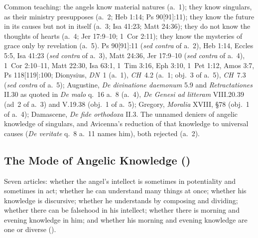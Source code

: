  {Common teaching: the angels know material natures (a.~1); they know
 singulars, as their ministry presupposes (a.~2; Heb 1:14; Ps
 90[91]:11); they know the future in its causes but not in itself (a.~3;
 Isa 41:23; Matt 24:36); they do not know the thoughts of hearts (a.~4;
 Jer 17:9--10; 1~Cor 2:11); they know the mysteries of grace only by
 revelation (a.~5).}
 {Ps 90[91]:11 (\emph{sed contra} of a.~2), Heb 1:14, Eccles 5:5, Isa
 41:23 (\emph{sed contra} of a.~3), Matt 24:36, Jer 17:9--10 (\emph{sed
 contra} of a.~4), 1~Cor 2:10--11, Matt 22:30, Isa 63:1, 1~Tim 3:16, Eph
 3:10, 1~Pet 1:12, Amos 3:7, Ps 118[119]:100; Dionysius, \emph{DN}~1
 (a.~1), \emph{CH}~4.2 (a.~1; obj.~3 of a.~5), \emph{CH}~7.3 (\emph{sed
 contra} of a.~5); Augustine, \emph{De divinatione daemonum} 5.9 and
 \emph{Retractationes} II.30 as quoted in \emph{De malo} q.~16 a.~8
 (a.~4), \emph{De Genesi ad litteram} VIII.20.39 (ad~2 of a.~3) and
 V.19.38 (obj.~1 of a.~5); Gregory, \emph{Moralia} XVIII, \S78
 (obj.~1 of a.~4); Damascene, \emph{De fide orthodoxa} II.3.}
 {The unnamed deniers of angelic knowledge of singulars, and Avicenna's
 reduction of that knowledge to universal causes (\emph{De veritate} q.~8
 a.~11 names him), both rejected (a.~2).}

\subsection{The Mode of Angelic Knowledge ()}\label{sec:q58}

Seven articles: whether the angel's intellect is sometimes in potentiality
and sometimes in act; whether he can understand many things at once;
whether his knowledge is discursive; whether he understands by composing
and dividing; whether there can be falsehood in his intellect; whether there
is morning and evening knowledge in him; and whether his morning and
evening knowledge are one or diverse
().

